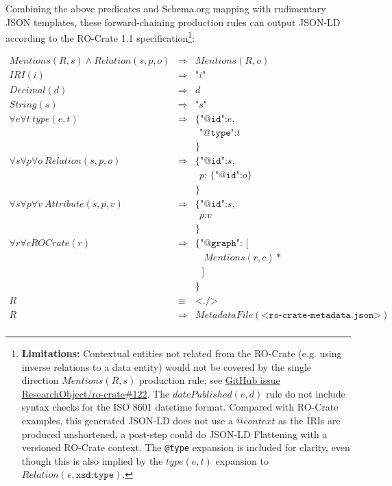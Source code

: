 Combining the above predicates and Schema.org mapping with rudimentary JSON templates, these forward-chaining production rules can output JSON-LD according to the RO-Crate 1.1 specification\footnote{
    \textbf{Limitations:} Contextual entities not related from the RO-Crate (e.g. using inverse relations to a data entity) would not be covered by the single direction $Mentions(R, s)$ production rule; see \href{https://github.com/ResearchObject/ro-crate/issues/122}{GitHub issue ResearchObject/ro-crate\#122}. The $datePublished(e, d)$ rule do not include syntax checks for the ISO 8601 datetime format. Compared with RO-Crate examples, this generated JSON-LD does not use a $@context$ as the IRIs are produced unshortened, a post-step could do JSON-LD Flattening with a versioned RO-Crate context. The \texttt{@type} expansion is included for clarity, even though this is also implied by the $type(e, t)$ expansion to $Relation(e, \texttt{xsd:type})$.
}:

\begin{eqnarray*}
Mentions(R, s) \land Relation(s,p,o)
                        & \Rightarrow & Mentions(R, o) \\
IRI(i)                  & \Rightarrow & \texttt{"} i \texttt{"} \\
Decimal(d)              & \Rightarrow & d \\
String(s)               & \Rightarrow & \texttt{"} s \texttt{"} \\
\forall e \forall t
\ type(e, t)            & \Rightarrow & \texttt{\{"@id":}  e \texttt{,} \\
&&                               \ \  \texttt{"@type":} t \\
&&                              \texttt{\}} \\
\forall s \forall p \forall o
\ Relation(s,p,o)
                        & \Rightarrow &  \texttt{\{"@id":}  s \texttt{,} \\
&&                               \ \  p \texttt{: \{ "@id":} o \texttt{\}} \\
&&                              \texttt{\}} \\
\forall s \forall p \forall v
\ Attribute(s,p,v)    & \Rightarrow &  \texttt{\{"@id":} s \texttt{,} \\
&&                               \ \ p \texttt{:} v  \\
&&                               \texttt{\}} \\
\forall r  \forall c
    ROCrate(r)      & \Rightarrow &  \texttt{\{ "@graph": [} \\
&& \ \ \ \ Mentions(r, c)* \\
&& \ \ \ \texttt{]} \\
&& \texttt{\}} \\
R   & \equiv & \texttt{<./>}  \\
R   & \Rightarrow &  MetadataFile(\texttt{<ro-crate-metadata.json>}) \\
\end{eqnarray*}

